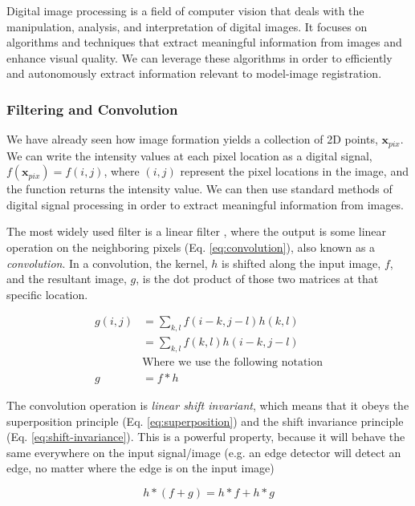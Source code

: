 Digital image processing is a field of computer vision that deals with the manipulation, analysis, and interpretation of digital images. It focuses on algorithms and techniques that extract meaningful information from images and enhance visual quality. We can leverage these algorithms in order to efficiently and autonomously extract information relevant to model-image registration.

\subsubsection{Filtering and Convolution}
\label{sec:filtering-convolution}
We have already seen how image formation yields a collection of 2D points, $\mathbf{x}_{pix}$. We can write the intensity values at each pixel location as a digital signal, $f(\mathbf{x}_{pix}) = f(i,j)$, where $(i,j)$ represent the pixel locations in the image, and the function returns the intensity value. We can then use standard methods of digital signal processing in order to extract meaningful information from images.

The most widely used filter is a linear filter \cite{szeliskiComputerVisionAlgorithms2022}, where the output is some linear operation on the neighboring pixels (Eq. \ref{eq:convolution}), also known as a \emph{convolution}. In a convolution, the kernel, $h$ is shifted along the input image, $f$, and the resultant image, $g$, is the dot product of those two matrices at that specific location.

\begin{equation}
    \begin{aligned}
        g(i,j) &= \sum_{k,l}f(i-k,j-l)h(k,l) \\
        &= \sum_{k,l}f(k,l)h(i-k,j-l) \\
        &\text{Where we use the following notation}\\
        g&= f * h
    \end{aligned}
    \label{eq:convolution}
\end{equation}

The convolution operation is \emph{linear shift invariant}, which means that it obeys the superposition principle (Eq. \ref{eq:superposition}) and the shift invariance principle (Eq. \ref{eq:shift-invariance}). This is a powerful property, because it will behave the same everywhere on the input signal/image (e.g. an edge detector will detect an edge, no matter where the edge is on the input image)

\begin{equation}
    h *(f + g) = h*f + h*g
    \label{eq:superposition}
\end{equation}

